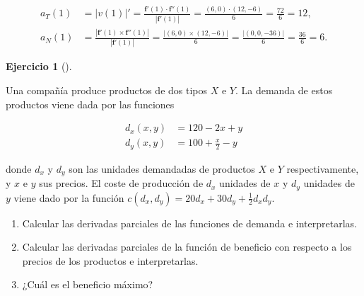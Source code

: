 \documentclass[
  spanish,
  a4paper,
]{scrreport}
\theoremstyle{definition}
\newtheorem{exercise}{Ejercicio}[chapter]
\theoremstyle{remark}
\begin{document}
\begin{tcolorbox}
\begin{enumerate}
  \begin{align*}
  a_T(1) 
  &= |v(1)|'
  = \frac{\mathbf{f}'(1) \cdot \mathbf{f}''(1)}{|\mathbf{f}'(1)|} 
  = \frac{(6, 0) \cdot (12, -6)}{6}
  = \frac{72}{6}
  = 12, \\
  a_N(1)
  &= \frac{|\mathbf{f}'(1) \times \mathbf{f}''(1)|}{|\mathbf{f}'(1)|}
  = \frac{|(6, 0) \times (12, -6)|}{6}
  = \frac{|(0, 0, -36)|}{6}
  = \frac{36}{6}
  = 6.
  \end{align*}
\end{enumerate}

\end{tcolorbox}

\begin{exercise}[]\protect\hypertarget{exr-2}{}\label{exr-2}

Una compañía produce productos de dos tipos \(X\) e \(Y\). La demanda de
estos productos viene dada por las funciones

\begin{align*}
d_x(x,y) &= 120 - 2x + y\\
d_y(x,y) &= 100 + \frac{x}{2} - y
\end{align*}

donde \(d_x\) y \(d_y\) son las unidades demandadas de productos \(X\) e
\(Y\) respectivamente, y \(x\) e \(y\) sus precios. El coste de
producción de \(d_x\) unidades de \(x\) y \(d_y\) unidades de \(y\)
viene dado por la función
\(c(d_x,d_y) = 20 d_x + 30 d_y + \frac{1}{2}d_xd_y\).

\begin{enumerate}
\def\labelenumi{\alph{enumi}.}
\item
  Calcular las derivadas parciales de las funciones de demanda e
  interpretarlas.
\item
  Calcular las derivadas parciales de la función de beneficio con
  respecto a los precios de los productos e interpretarlas.
\item
  ¿Cuál es el beneficio máximo?
\end{enumerate}

\end{exercise}
\end{document}

